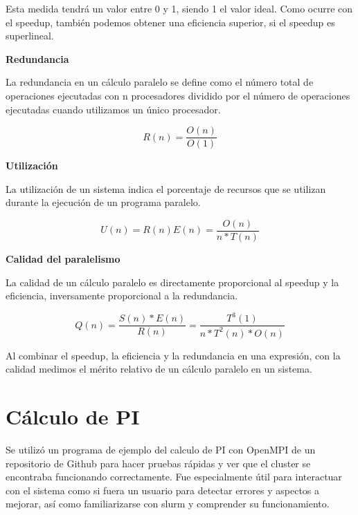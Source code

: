 Esta medida tendrá un valor entre 0 y 1, siendo 1 el valor ideal. Como ocurre con el speedup, también podemos obtener una eficiencia superior, si el speedup es superlineal.

\vspace{4mm}
\textbf{Redundancia}
\vspace{2mm}

La redundancia en un cálculo paralelo se define como el número total de operaciones ejecutadas con n procesadores dividido por el número de operaciones ejecutadas cuando utilizamos un único procesador.

\begin{equation*}
    R(n) = \frac{O(n)}{O(1)}
\end{equation*}

\vspace{4mm}
\textbf{Utilización}
\vspace{2mm}

La utilización de un sistema indica el porcentaje de recursos que se utilizan durante la ejecución de un programa paralelo.

\begin{equation*}
    U(n) = R(n)E(n) = \frac{O(n)}{n * T(n)}
\end{equation*}


\vspace{4mm}
\textbf{Calidad del paralelismo}
\vspace{2mm}

La calidad de un cálculo paralelo es directamente proporcional al speedup y la eficiencia, inversamente proporcional a la redundancia.
\vspace{2mm}

\begin{equation*}
    Q(n) = \frac{S(n)*E(n)}{R(n)} = \frac{T^{3}(1)}{n*T^{2}(n)*O(n)}
\end{equation*}
\vspace{2mm}

Al combinar el speedup, la eficiencia y la redundancia en una expresión, con la calidad medimos el mérito relativo de un cálculo paralelo en un sistema.

\section{Cálculo de PI}

Se utilizó un programa de ejemplo del calculo de PI con OpenMPI de un repositorio de Github \cite{piprogram} para hacer pruebas rápidas y ver que el cluster se encontraba funcionando correctamente. Fue especialmente útil para interactuar con el sistema como si fuera un usuario para detectar errores y aspectos a mejorar, así como familiarizarse con slurm y comprender su funcionamiento.
\vspace{2mm}

